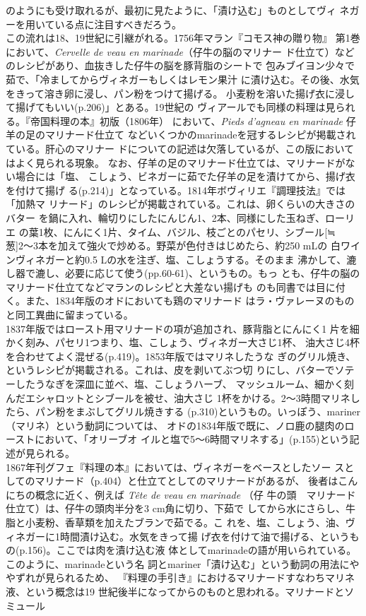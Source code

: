 {{{{  のようにも受け取れるが、最初に見たように、「漬け込む」ものとしてヴィ
  ネガーを用いている点に注目すべきだろう。\\
  この流れは18、19世紀に引継がれる。1756年マラン『コモス神の贈り物』
  第1巻において、\emph{Cervelle de veau en marinade}（仔牛の脳のマリナー
  ド仕立て）などのレシピがあり、血抜きした仔牛の脳を豚背脂のシートで
  包みブイヨン少々で茹で、「冷ましてからヴィネガーもしくはレモン果汁
  に漬け込む。その後、水気をきって溶き卵に浸し、パン粉をつけて揚げる。
  小麦粉を溶いた揚げ衣に浸して揚げてもいい(p.206)」とある。19世紀の
  ヴィアールでも同様の料理は見られる。『帝国料理の本』初版（1806年）
  において、\emph{Pieds d'agneau en marinade} 仔羊の足のマリナード仕立て
  などいくつかのmarinadeを冠するレシピが掲載されている。肝心のマリナー
  ドについての記述は欠落しているが、この版においてはよく見られる現象。
  なお、仔羊の足のマリナード仕立ては、マリナードがない場合には「塩、
  こしょう、ビネガーに茹でた仔羊の足を漬けてから、揚げ衣を付けて揚げ
  る(p.214)」となっている。1814年ボヴィリエ『調理技法』では「加熱マ
  リナード」のレシピが掲載されている。これは、卵くらいの大きさのバター
  を鍋に入れ、輪切りにしたにんじん1、2本、同様にした玉ねぎ、ローリエ
  の葉1枚、にんにく1片、タイム、バジル、枝ごとのパセリ、シブール{[}≒
  葱{]}2〜3本を加えて強火で炒める。野菜が色付きはじめたら、約250 mLの
  白ワインヴィネガーと約0.5 Lの水を注ぎ、塩、こしょうする。そのまま
  沸かして、漉し器で漉し、必要に応じて使う(pp.60-61)、というもの。もっ
  とも、仔牛の脳のマリナード仕立てなどマランのレシピと大差ない揚げも
  のも同書では目に付く。また、1834年版のオドにおいても鶏のマリナード
  はラ・ヴァレーヌのものと同工異曲に留まっている。\\
  1837年版ではロースト用マリナードの項が追加され、豚背脂とにんにく1
  片を細かく刻み、パセリ1つまり、塩、こしょう、ヴィネガー大さじ1杯、
  油大さじ4杯を合わせてよく混ぜる(p.419)。1853年版ではマリネしたうな
  ぎのグリル焼き、というレシピが掲載される。これは、皮を剥いてぶつ切
  りにし、バターでソテーしたうなぎを深皿に並べ、塩、こしょうハーブ、
  マッシュルーム、細かく刻んだエシャロットとシブールを被せ、油大さじ
  1杯をかける。2〜3時間マリネしたら、パン粉をまぶしてグリル焼きする
  (p.310)というもの。いっぽう、mariner（マリネ）という動詞については、
  オドの1834年版で既に、ノロ鹿の腿肉のローストにおいて、「オリーブオ
  イルと塩で5〜6時間マリネする」(p.155)という記述が見られる。\\
  1867年刊グフェ『料理の本』においては、ヴィネガーをベースとしたソー
  スとしてのマリナード（p.404）と仕立てとしてのマリナードがあるが、
  後者はこんにちの概念に近く、例えば \emph{Tête de veau en marinade}
  （仔 牛の頭　マリナード仕立て）は、仔牛の頭肉半分を3
  cm角に切り、下茹で
  してから水にさらし、牛脂と小麦粉、香草類を加えたブランで茹でる。こ
  れを、塩、こしょう、油、ヴィネガーに1時間漬け込む。水気をきって揚
  げ衣を付けて油で揚げる、というもの(p.156)。ここでは肉を漬け込む液
  体としてmarinadeの語が用いられている。このように、marinadeという名
  詞とmariner「漬け込む」という動詞の用法にややずれが見られるため、
  『料理の手引き』におけるマリナードすなわちマリネ液、という概念は19
  世紀後半になってからのものと思われる。}}{マリナードとソミュール}}\label{marinades-et-saumures}}

